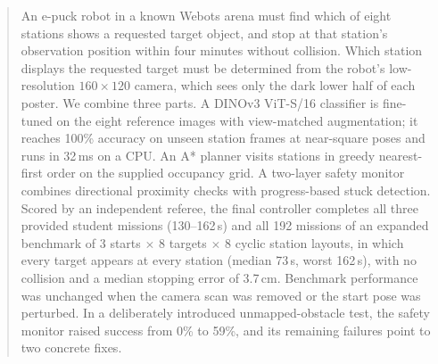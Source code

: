 \begin{abstract}
An e-puck robot in a known Webots arena must find which of eight stations shows a requested target object, and stop at that station's observation position within four minutes without collision. Which station displays the requested target must be determined from the robot's low-resolution $160{\times}120$ camera, which sees only the dark lower half of each poster. We combine three parts. A DINOv3 ViT-S/16 classifier is fine-tuned on the eight reference images with view-matched augmentation; it reaches 100\% accuracy on unseen station frames at near-square poses and runs in 32\,ms on a CPU. An A* planner visits stations in greedy nearest-first order on the supplied occupancy grid. A two-layer safety monitor combines directional proximity checks with progress-based stuck detection. Scored by an independent referee, the final controller completes all three provided student missions (130--162\,s) and all 192 missions of an expanded benchmark of 3 starts $\times$ 8 targets $\times$ 8 cyclic station layouts, in which every target appears at every station (median 73\,s, worst 162\,s), with no collision and a median stopping error of 3.7\,cm. Benchmark performance was unchanged when the camera scan was removed or the start pose was perturbed. In a deliberately introduced unmapped-obstacle test, the safety monitor raised success from 0\% to 59\%, and its remaining failures point to two concrete fixes.
\end{abstract}
